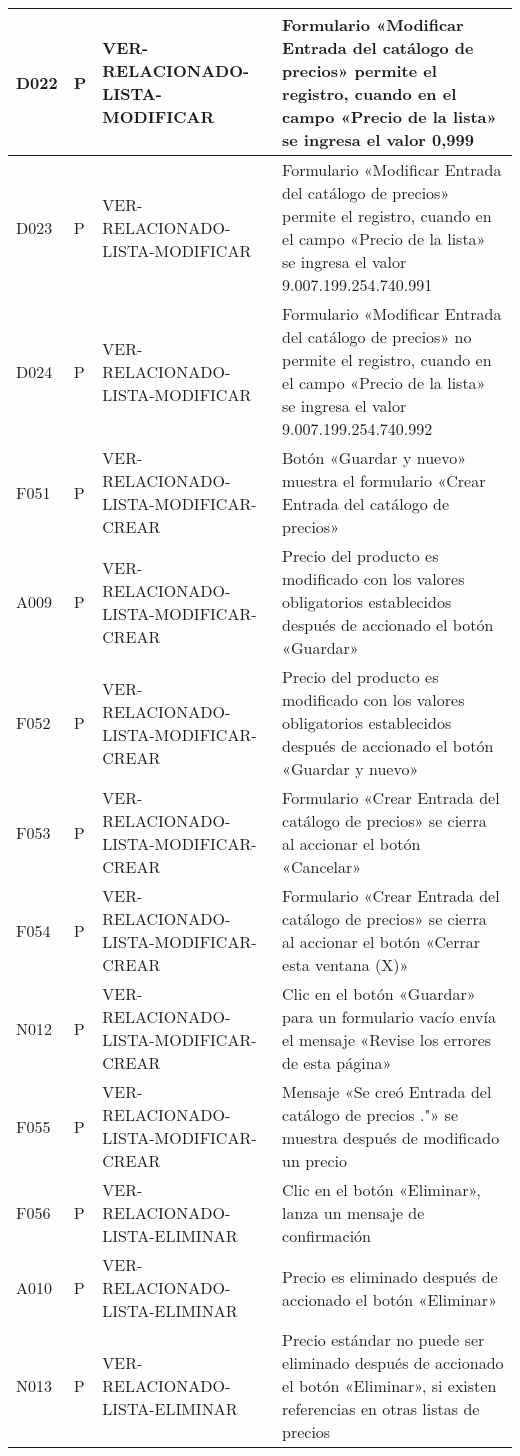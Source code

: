 \begin{landscape}
\begin{longtable}[htb]{|l|l|p{5.0cm}|p{13.0cm}|}
D022 & P & VER-RELACIONADO-LISTA-MODIFICAR & Formulario «Modificar Entrada del catálogo de precios» permite el registro, cuando en el campo «Precio de la lista» se ingresa el valor 0,999 \\ \hline
D023 & P & VER-RELACIONADO-LISTA-MODIFICAR & Formulario «Modificar Entrada del catálogo de precios» permite el registro, cuando en el campo «Precio de la lista» se ingresa el valor 9.007.199.254.740.991 \\ \hline
D024 & P & VER-RELACIONADO-LISTA-MODIFICAR & Formulario «Modificar Entrada del catálogo de precios» no permite el registro, cuando en el campo «Precio de la lista» se ingresa el valor 9.007.199.254.740.992 \\ \hline
F051 & P & VER-RELACIONADO-LISTA-MODIFICAR-CREAR & Botón «Guardar y nuevo» muestra el formulario «Crear Entrada del catálogo de precios» \\ \hline
A009 & P & VER-RELACIONADO-LISTA-MODIFICAR-CREAR & Precio del producto es modificado con los valores obligatorios establecidos después de accionado el botón «Guardar» \\ \hline
F052 & P & VER-RELACIONADO-LISTA-MODIFICAR-CREAR & Precio del producto es modificado con los valores obligatorios establecidos después de accionado el botón «Guardar y nuevo» \\ \hline
F053 & P & VER-RELACIONADO-LISTA-MODIFICAR-CREAR & Formulario «Crear Entrada del catálogo de precios» se cierra al accionar el botón «Cancelar» \\ \hline
F054 & P & VER-RELACIONADO-LISTA-MODIFICAR-CREAR & Formulario «Crear Entrada del catálogo de precios» se cierra al accionar el botón «Cerrar esta ventana (X)» \\ \hline
N012 & P & VER-RELACIONADO-LISTA-MODIFICAR-CREAR & Clic en el botón «Guardar» para un formulario vacío envía el mensaje «Revise los errores de esta página» \\ \hline
F055 & P & VER-RELACIONADO-LISTA-MODIFICAR-CREAR & Mensaje «Se creó Entrada del catálogo de precios ."» se muestra después de modificado un precio \\ \hline
F056 & P & VER-RELACIONADO-LISTA-ELIMINAR & Clic en el botón «Eliminar», lanza un mensaje de confirmación \\ \hline
A010 & P & VER-RELACIONADO-LISTA-ELIMINAR & Precio es eliminado después de accionado el botón «Eliminar» \\ \hline
N013 & P & VER-RELACIONADO-LISTA-ELIMINAR & Precio estándar no puede ser eliminado después de accionado el botón «Eliminar», si existen referencias en otras listas de precios \\ \hline

\end{longtable}
\end{landscape}
